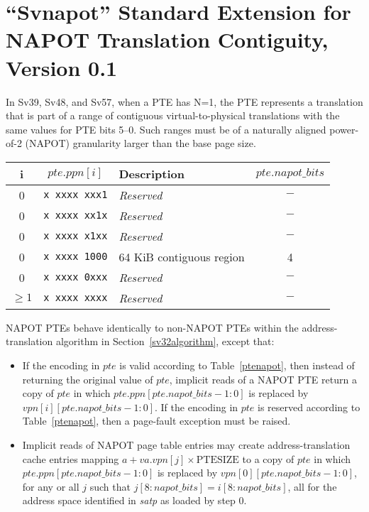 \chapter{``Svnapot'' Standard Extension for NAPOT Translation Contiguity, Version 0.1}
\label{svnapot}

In Sv39, Sv48, and Sv57, when a PTE has N=1, the PTE represents a
translation that is part of a range of contiguous virtual-to-physical
translations with the same values for PTE bits 5--0.  Such ranges must be of a
naturally aligned power-of-2 (NAPOT) granularity larger than the base page
size.

\begin{table*}[h!]
\begin{center}
\begin{tabular}{|c|c||l|c|}
\hline
i        & $pte.ppn[i]$      & Description              & $pte.napot\_bits$ \\
\hline
0        & {\tt x~xxxx~xxx1} & {\em Reserved}           & $-$ \\
0        & {\tt x~xxxx~xx1x} & {\em Reserved}           & $-$ \\
0        & {\tt x~xxxx~x1xx} & {\em Reserved}           & $-$ \\
0        & {\tt x~xxxx~1000} & 64 KiB contiguous region & 4   \\
0        & {\tt x~xxxx~0xxx} & {\em Reserved}           & $-$ \\
$\geq 1$ & {\tt x~xxxx~xxxx} & {\em Reserved}           & $-$ \\
\hline
\end{tabular}
\end{center}
\caption{Page table entry encodings when $pte$.N=1}
\label{ptenapot}
\end{table*}

NAPOT PTEs behave identically to non-NAPOT PTEs within the address-translation
algorithm in Section~\ref{sv32algorithm}, except that:
\begin{itemize}
  \item If the encoding in $pte$ is valid according to Table~\ref{ptenapot},
    then instead of returning the original value of $pte$, implicit reads of a
    NAPOT PTE return a copy of $pte$ in which $pte.ppn[pte.napot\_bits-1:0]$ is
    replaced by $vpn[i][pte.napot\_bits-1:0]$.  If the encoding in $pte$ is
    reserved according to Table~\ref{ptenapot}, then a page-fault exception
    must be raised.
  \item Implicit reads of NAPOT page table entries may create address-translation cache
    entries mapping $a + va.vpn[j] \times \textrm{PTESIZE}$ to a copy of $pte$
    in which $pte.ppn[pte.napot\_bits-1:0]$ is replaced by
    $vpn[0][pte.napot\_bits-1:0]$, for any or all $j$ such that
    ${j[8:napot\_bits]}={i[8:napot\_bits]}$, all for the address space identified
    in {\em satp} as loaded by step 0.
\end{itemize}


